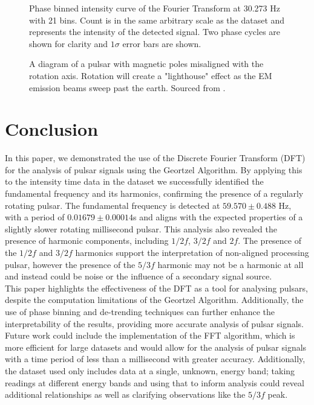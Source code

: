\documentclass[reqno]{amsart}
\numberwithin{equation}{section}
\numberwithin{figure}{section}
\begin{document}
\begin{figure}[ht]
    \centering
    
    \caption{Phase binned intensity curve of the Fourier Transform at 30.273 Hz with 21 bins. Count is in the same arbitrary scale as the dataset and represents the intensity of the detected signal. Two phase cycles are shown for clarity and $1\sigma$ error bars are shown.}
    \label{fig:phasebins_half}
\end{figure}

\begin{figure}[ht]
    \centering
    
    \caption{A diagram of a pulsar with magnetic poles misaligned with the rotation axis. Rotation will create a "lighthouse" effect as the EM emission beams sweep past the earth. Sourced from \cite{knierim_tikz_assortment}.}
    \label{fig:pulsar}
\end{figure}

\section{Conclusion}
In this paper, we demonstrated the use of the Discrete Fourier Transform (DFT) for the analysis of pulsar signals using the Geortzel Algorithm. By applying this to the intensity time data in the dataset we successfully identified the fundamental frequency and its harmonics, confirming the presence of a regularly rotating pulsar. The fundamental frequency is detected at $59.570 \pm 0.488$ Hz, with a period of $0.01679 \pm 0.00014$s and aligns with the expected properties of a slightly slower rotating millisecond pulsar. This analysis also revealed the presence of harmonic components, including $1/2f$, $3/2f$ and $2f$. The presence of the $1/2f$ and $3/2f$ harmonics support the interpretation of non-aligned processing pulsar, however the presence of the $5/3f$ harmonic may not be a harmonic at all and instead could be noise or the influence of a secondary signal source. \\

This paper highlights the effectiveness of the DFT as a tool for analysing pulsars, despite the computation limitations of the Geortzel Algorithm. Additionally, the use of phase binning and de-trending techniques can further enhance the interpretability of the results, providing more accurate analysis of pulsar signals. \\

Future work could include the implementation of the FFT algorithm, which is more efficient for large datasets and would allow for the analysis of pulsar signals with a time period of less than a millisecond with greater accuracy. Additionally, the dataset used only includes data at a single, unknown, energy band; taking readings at different energy bands and using that to inform analysis could reveal additional relationships as well as clarifying observations like the $5/3f$ peak.
\end{document}
